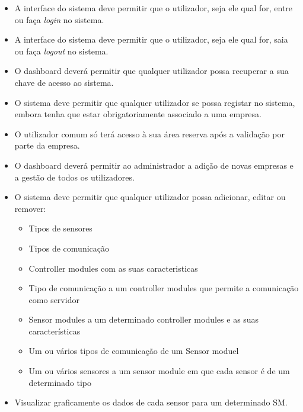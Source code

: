 \begin{itemize}
	\item A interface do sistema deve permitir que o utilizador, seja ele qual for, entre ou faça \textit{login} no sistema. 
	
	\item A interface do sistema deve permitir que o utilizador, seja ele qual for, saia ou faça \textit{logout} no sistema.
	
	\item O dashboard deverá permitir que qualquer utilizador possa recuperar a sua chave de acesso ao sistema.
	
	\item O sistema deve permitir que qualquer utilizador se possa registar no sistema, embora tenha que estar obrigatoriamente associado a uma empresa.
	
	\item O utilizador comum só terá acesso à sua área reserva após a validação por parte da empresa.   
	
	\item O dashboard deverá permitir ao administrador a adição de novas empresas e a gestão de todos os utilizadores. 
	
	\item O sistema deve permitir que qualquer utilizador possa adicionar, editar ou remover: 
	\begin{itemize}
		\item Tipos de sensores
		
		\item Tipos de comunicação
		
		\item Controller modules com as suas caracteristicas
		
		\item Tipo de comunicação a um controller modules que permite a comunicação como servidor 
		
		\item Sensor modules a um determinado controller modules e as suas características 
		
		\item Um ou vários tipos de comunicação de um Sensor moduel
		
		\item Um ou vários sensores a um sensor module em que cada sensor é de um determinado tipo 
		
	\end{itemize}
	
	\item Visualizar graficamente os dados de cada sensor para um determinado \ac{SM}. 
	

\end{itemize}
